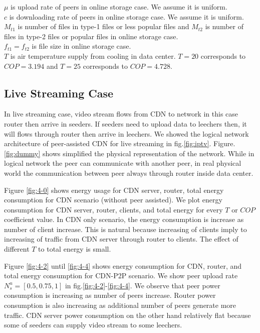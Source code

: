 \documentclass[conference]{IEEEtran}
\begin{document}
$\mu$ is upload rate of peers in online storage case. We assume it is uniform. \\
$c$ is downloading rate of peers in online storage case. We assume it is uniform.
$M_{t1}$ is number of files in type-1 files or less popular files and $M_{t2}$ is number of files in type-2 files or popular files in online storage case.\\
$f_{t1} = f_{t2}$ is file size in online storage case.\\
$T$ is air temperature supply from cooling in data center.  $T=20$ corresponds to $COP=3.194$ and $T=25$ corresponds to $COP=4.728$.\\



\subsection{Live Streaming Case}
In live streaming case, video stream flows from CDN to network in this case router then arrive in seeders. 
If seeders need to upload data to leechers then, it will flows through router then arrive in leechers. 
We showed the logical network architecture of peer-assisted CDN for live streaming in fig.\ref{fig:iptv}.
Figure.\ref{fig:dummy} shows simplified the physical representation of the network.  
While in logical network the peer can communicate with another peer, in real physical world the communication between peer always through router inside data center.

Figure \ref{fig:4-0} shows energy usage for CDN server, router, total energy consumption for CDN scenario (without peer assisted).
We plot energy consumption for CDN server, router, clients, and total energy for every $T$ or $COP$ coefficient value.
In CDN only scenario, the energy consumption is increase as number of client increase.  
This is natural because increasing of clients imply to increasing of traffic from CDN server through router to clients.
The effect of different $T$ to total energy is small.  

Figure \ref{fig:4-2} until \ref{fig:4-4} shows energy consumption for CDN, router, and total energy consumption for CDN-P2P scenario.
We show peer upload rate $N_{s}^{u}=[0.5, 0.75, 1]$ in fig.\ref{fig:4-2}-\ref{fig:4-4}. 
We observe that peer power consumption is increasing as number of peers increase.  
Router power consumption is also increasing as additional number of peers generate more traffic. 
CDN server power consumption on the other hand relatively flat because some of seeders can supply video stream to some leechers.
\end{document}
